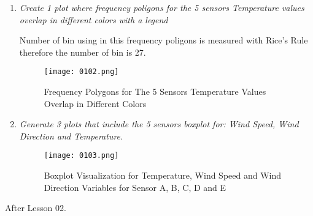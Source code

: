 \documentclass[a4paper,12pt]{article} %
\begin{document}
\begin{enumerate}
\item {\it Create 1 plot where frequency poligons for the 5 sensors Temperature values overlap in different colors with a legend}

Number of bin using in this frequency poligons is measured with Rice's Rule therefore the number of bin is 27.

\setlength{\belowcaptionskip}{-10pt}
\begin{figure}[H]
    \centering
    \texttt{[image: 0102.png]}
    \caption{Frequency Polygons for The 5 Sensors Temperature Values Overlap in Different Colors}
    \label{fig:my_label}
\end{figure}

\item {\it Generate 3 plots that include the 5 sensors boxplot for: Wind Speed, Wind Direction and Temperature.}
\setlength{\belowcaptionskip}{-10pt}
\begin{figure}[H]
    \centering
    \texttt{[image: 0103.png]}
    \caption{Boxplot Visualization for Temperature, Wind Speed and Wind Direction Variables for Sensor A, B, C, D and E}
    \label{fig:my_label}
\end{figure}

\end{enumerate}

\begin{flushleft}
\Large{After Lesson 02.}
\end{flushleft}
\end{document}
